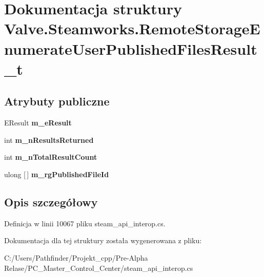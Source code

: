 \hypertarget{struct_valve_1_1_steamworks_1_1_remote_storage_enumerate_user_published_files_result__t}{}\section{Dokumentacja struktury Valve.\+Steamworks.\+Remote\+Storage\+Enumerate\+User\+Published\+Files\+Result\+\_\+t}
\label{struct_valve_1_1_steamworks_1_1_remote_storage_enumerate_user_published_files_result__t}
\subsection*{Atrybuty publiczne}
\begin{DoxyCompactItemize}
\item 
\mbox{\label{struct_valve_1_1_steamworks_1_1_remote_storage_enumerate_user_published_files_result__t_ab4ab9140853df23def2ee971dedcb9df}} 
E\+Result {\bfseries m\+\_\+e\+Result}
\item 
\mbox{\label{struct_valve_1_1_steamworks_1_1_remote_storage_enumerate_user_published_files_result__t_ae13cc7f8002421d10aca37147d1ffd94}} 
int {\bfseries m\+\_\+n\+Results\+Returned}
\item 
\mbox{\label{struct_valve_1_1_steamworks_1_1_remote_storage_enumerate_user_published_files_result__t_a17a52d401bf42e2911addf565922b278}} 
int {\bfseries m\+\_\+n\+Total\+Result\+Count}
\item 
\mbox{\label{struct_valve_1_1_steamworks_1_1_remote_storage_enumerate_user_published_files_result__t_a4738dae38aa758de1db272c9e27badd1}} 
ulong \mbox{[}$\,$\mbox{]} {\bfseries m\+\_\+rg\+Published\+File\+Id}
\end{DoxyCompactItemize}


\subsection{Opis szczegółowy}


Definicja w linii 10067 pliku steam\+\_\+api\+\_\+interop.\+cs.



Dokumentacja dla tej struktury została wygenerowana z pliku\+:\begin{DoxyCompactItemize}
\item 
C\+:/\+Users/\+Pathfinder/\+Projekt\+\_\+cpp/\+Pre-\/\+Alpha Relase/\+P\+C\+\_\+\+Master\+\_\+\+Control\+\_\+\+Center/steam\+\_\+api\+\_\+interop.\+cs\end{DoxyCompactItemize}
